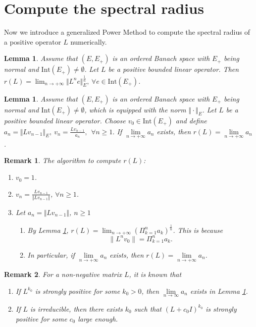 \documentclass[12pt,reqno]{article}
\newtheorem{lemma}[theorem]{Lemma}
\newtheorem{remark}{Remark}
\newcommand{\Int}{\mathrm{Int}}
\begin{document}
\section{Compute the spectral radius}\label{sec:spectral}
 Now we introduce a generalized Power Method to compute the spectral radius of a positive operator $L$ numerically.

\begin{lemma}\label{lem:com:r(L):1}
	Assume that $(E,E_+)$ is an ordered Banach space with $E_+$ being normal and $\Int (E_+) \neq \emptyset$. Let $L$ be a positive bounded linear operator. Then $r(L)= \lim_{n \rightarrow +\infty } \Vert L^n e \Vert_E^{\frac{1}{n}},~\forall e \in \Int (E_+)$.
\end{lemma}
\begin{lemma}\label{lem:com:r(L):2}
	Assume that $(E,E_+)$ is an ordered Banach space with $E_+$ being normal and $\Int (E_+) \neq \emptyset$, which is equipped with the norm $\Vert \cdot \Vert_E$. Let $L$ be a positive bounded linear operator. Choose $v_0 \in \Int (E_+)$ and define
	$
	a_n=\Vert L v_{n-1} \Vert_E,~
	v_n =\frac{ L v_{n-1}}{a_n}, ~
	~\forall n\geq 1.
	$
	If $\lim\limits_{ n\rightarrow +\infty} a_n$ exists, then $r(L)=\lim\limits_{ n\rightarrow +\infty} a_n$.
\end{lemma}

\begin{remark}\label{rem:com:r(L)}
	The algorithm to compute $r(L)$:
	\begin{enumerate}
		\item $v_0=1$.
		\item $v_n = \frac{L v_{n-1}}{\Vert L v_{n-1} \Vert }$, $\forall n \geq 1$.
		\item Let $a_n =\Vert L v_{n-1} \Vert $, $n\geq 1$
		\begin{enumerate}
			\item By Lemma \ref{lem:com:r(L):1}, $r(L)= \lim_{n \rightarrow +\infty } (\Pi_{k=1}^n a_k )^{\frac{1}{n}}$. This is because
			\begin{equation}
			{\|L^n v_0\|} = \Pi_{k=1}^n a_k .
			\end{equation}
			\item In particular, if $\lim\limits_{ n\rightarrow +\infty} a_n$ exists, then $r(L)=\lim\limits_{ n\rightarrow +\infty} a_n$.
		\end{enumerate}
	\end{enumerate}
\end{remark}

\begin{remark}
	For a  non-negative matrix $L$, it is known that
	\begin{enumerate}
		\item If $L^{k_0}$ is strongly positive for some $k_0>0$, then $\lim\limits_{n \rightarrow \infty}a_n$ exists in Lemma \ref{lem:com:r(L):2}.
		\item  If $L$ is  irreducible, then there exists $k_0$ such that $(L+c_0 I)^{k_0}$ is strongly positive for some $c_0$ large enough.
	\end{enumerate}
\end{remark}
\end{document}
